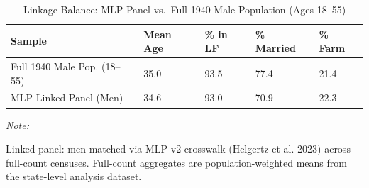 \begin{table}
\centering
\caption{\label{tab:linkage}Linkage Balance: MLP Panel vs.\ Full 1940 Male Population (Ages 18--55)}
\centering
\begin{threeparttable}
\begin{tabular}[t]{lllll}
\toprule
Sample & Mean Age & \% in LF & \% Married & \% Farm\\
\midrule
Full 1940 Male Pop. (18--55) & 35.0 & 93.5 & 77.4 & 21.4\\
MLP-Linked Panel (Men) & 34.6 & 93.0 & 70.9 & 22.3\\
\bottomrule
\end{tabular}
\begin{tablenotes}
\item \textit{Note: } 
\item Linked panel: men matched via MLP v2 crosswalk (Helgertz et al. 2023) across full-count censuses. Full-count aggregates are population-weighted means from the state-level analysis dataset.
\end{tablenotes}
\end{threeparttable}
\end{table}
